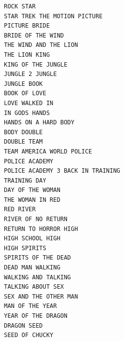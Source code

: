 \documentclass[11pt,english]{article}
\begin{document}
\begin{appendices}
{\begin{multicols}{2}
\begin{verbatim}
ROCK STAR
STAR TREK THE MOTION PICTURE
PICTURE BRIDE
BRIDE OF THE WIND
THE WIND AND THE LION
THE LION KING
KING OF THE JUNGLE
JUNGLE 2 JUNGLE
JUNGLE BOOK
BOOK OF LOVE
LOVE WALKED IN
IN GODS HANDS
HANDS ON A HARD BODY
BODY DOUBLE
DOUBLE TEAM
TEAM AMERICA WORLD POLICE
POLICE ACADEMY
POLICE ACADEMY 3 BACK IN TRAINING
TRAINING DAY
DAY OF THE WOMAN
THE WOMAN IN RED
RED RIVER
RIVER OF NO RETURN
RETURN TO HORROR HIGH
HIGH SCHOOL HIGH
HIGH SPIRITS
SPIRITS OF THE DEAD
DEAD MAN WALKING
WALKING AND TALKING
TALKING ABOUT SEX
SEX AND THE OTHER MAN
MAN OF THE YEAR
YEAR OF THE DRAGON
DRAGON SEED
SEED OF CHUCKY
\end{verbatim}
\end{multicols}
}
\end{appendices}
\end{document}
